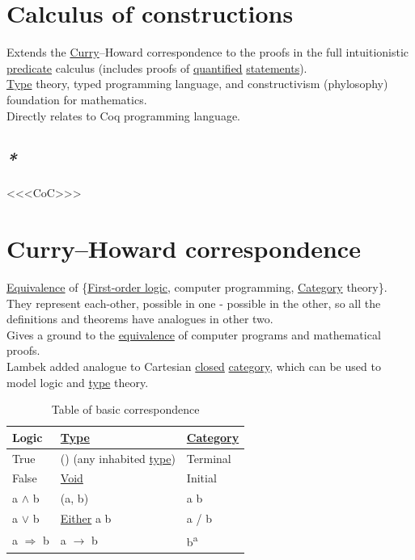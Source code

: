 \documentclass[a4paper,14pt,oneside]{book}
\begin{document}
\section{\label{orgfbf439a}Calculus of constructions}
\label{sec:org624c6fd}
Extends the \hyperref[org8a3c61e]{Curry}–Howard correspondence to the proofs in the full intuitionistic \hyperref[org24dc504]{predicate} calculus (includes proofs of \hyperref[org23635f1]{quantified} \hyperref[org6e51f82]{statements}).\\
\hyperref[org86debe5]{Type} theory, typed programming language, and constructivism (phylosophy) foundation for mathematics.\\
Directly relates to Coq programming language.\\

\subsection{\emph{*}}
\label{sec:org1b2605b}

<<<\label{org43fe9aa}CoC>>>\\

\section{\label{orgd670145}Curry–Howard correspondence}
\label{sec:orgef34685}
\hyperref[orgbb10ed7]{Equivalence} of \{\hyperref[org7fbc0eb]{First-order logic}, computer programming, \hyperref[org55c29c0]{Category} theory\}. They represent each-other, possible in one - possible in the other, so all the definitions and theorems have analogues in other two.\\

Gives a ground to the \hyperref[orgbb10ed7]{equivalence} of computer programs and mathematical proofs.\\

Lambek added analogue to Cartesian \hyperref[org11ec670]{closed} \hyperref[org55c29c0]{category}, which can be used to model logic and \hyperref[org86debe5]{type} theory.\\

\begin{table}[htbp]
\caption{\label{tab--table-of-basic-correspondence}Table of basic correspondence}
\centering
\begin{tabular}{lll}
Logic & \hyperref[org86debe5]{Type} & \hyperref[org55c29c0]{Category}\\
\hline
True & () (any inhabited \hyperref[org86debe5]{type}) & Terminal\\
False & \hyperref[orgc6e5644]{Void} & Initial\\
a \(\land\) b & (a, b) & a \texttimes{} b\\
a \(\lor\) b & \hyperref[org8dbf6f6]{Either} a b & a /     b\\
a \(\Rightarrow\) b & a \(\to\) b & b\textsuperscript{a}\\
\end{tabular}
\end{table}
\end{document}
